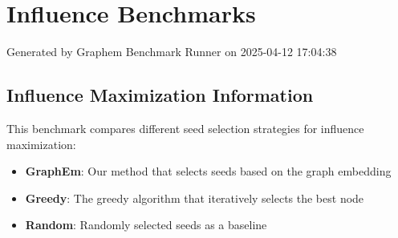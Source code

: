 \documentclass{article}
\begin{document}
\section*{Influence Benchmarks}
Generated by Graphem Benchmark Runner on 2025-04-12 17:04:38
\subsection*{Influence Maximization Information}
This benchmark compares different seed selection strategies for influence maximization:
\begin{itemize}
\item \textbf{GraphEm}: Our method that selects seeds based on the graph embedding
\item \textbf{Greedy}: The greedy algorithm that iteratively selects the best node
\item \textbf{Random}: Randomly selected seeds as a baseline
\end{itemize}
\end{document}
